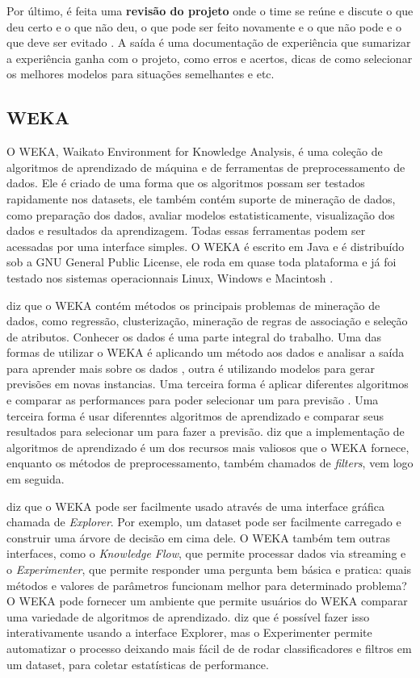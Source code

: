 Por último, é feita uma \textbf{revisão do projeto} onde o time se reúne e discute o que deu certo e o que não deu, o que pode ser feito novamente e o que não pode e o que deve ser evitado \citep{dmfd}.
A saída é uma documentação de experiência que sumarizar a experiência ganha com o projeto, como erros e acertos, dicas de como selecionar os melhores modelos para situações semelhantes e etc.

\subsection{WEKA}

O WEKA, Waikato Environment for Knowledge Analysis, é uma coleção de algoritmos de aprendizado de máquina e de ferramentas de preprocessamento de dados. Ele é criado de uma forma que os algoritmos possam ser testados rapidamente nos datasets, ele também contém suporte de mineração de dados, como preparação dos dados, avaliar modelos estatisticamente, visualização dos dados e resultados da aprendizagem. Todas essas ferramentas podem ser acessadas por uma interface simples. O WEKA é escrito em Java e é distribuído sob a GNU General Public License, ele roda em quase toda plataforma e já foi testado nos sistemas operacionnais Linux, Windows e Macintosh .

 diz que o WEKA contém métodos os principais problemas de mineração de dados, como regressão, clusterização, mineração de regras de associação e seleção de atributos. Conhecer os dados é uma parte integral do trabalho. Uma das formas de utilizar o WEKA é aplicando um método aos dados e analisar a saída para aprender mais sobre os dados , outra é utilizando modelos para gerar previsões em novas instancias. Uma terceira forma é aplicar diferentes algoritmos e comparar as performances para poder selecionar um para previsão . Uma terceira forma é usar diferenntes algoritmos de aprendizado e comparar seus resultados para selecionar um para fazer a previsão.  diz que a implementação de algoritmos de aprendizado é um dos recursos mais valiosos que o WEKA fornece, enquanto os métodos de preprocessamento, também chamados de \textit{filters}, vem logo em seguida. 

 diz que o WEKA pode ser facilmente usado através de uma interface gráfica chamada de \textit{Explorer}. Por exemplo, um dataset pode ser facilmente carregado e construir uma árvore de decisão em cima dele. O WEKA também tem outras interfaces, como o \textit{Knowledge Flow}, que permite processar dados via streaming e o \textit{Experimenter}, que permite responder uma pergunta bem básica e pratica: quais métodos e valores de parâmetros funcionam melhor para determinado problema? O WEKA pode fornecer um ambiente que permite usuários do WEKA comparar uma variedade de algoritmos de aprendizado.  diz que é possível fazer isso interativamente usando a  interface Explorer, mas o Experimenter permite automatizar o processo deixando mais fácil de de rodar classificadores e filtros em um dataset, para coletar estatísticas de performance.

